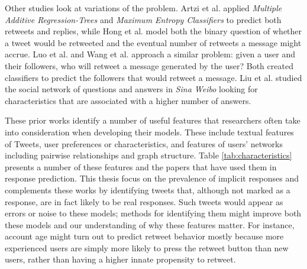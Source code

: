 Other studies look at variations of the problem.  
Artzi et al. \cite{Artzi2012} applied \textit{Multiple Additive Regression-Trees} and \textit{Maximum Entropy Classifiers} to predict both retweets and replies, while Hong et al. \cite{Hong2011} model both the binary question of whether a tweet would be retweeted and the eventual number of retweets a message might accrue.  
Luo et al. \cite{Luo2013} and Wang et al. \cite{Wang2012} approach a similar problem: given a user and their followers, who will retweet a message generated by the user?  Both created classifiers to predict the followers that would retweet a message.  
Liu et al. \cite{Liu2013} studied the social network of questions and answers in \textit{Sina Weibo} looking for characteristics that are associated with a higher number of answers.

These prior works identify a number of useful features that researchers often take into consideration when developing their models.  These include textual features of Tweets, user preferences or characteristics, and features of users' networks including pairwise relationships and graph structure.  Table \ref{tab:characteristics} presents a number of these features and the papers that have used them in response prediction.  This thesis focus on the prevalence of implicit responses and complements these works by identifying tweets that, although not marked as a response, are in fact likely to be real responses.  Such tweets would appear as errors or noise to these models; methods for identifying them might improve both these models and our understanding of why these features matter. For instance, account age might turn out to predict retweet behavior mostly because more experienced users are simply more likely to press the retweet button than new users, rather than having a higher innate propensity to retweet.

